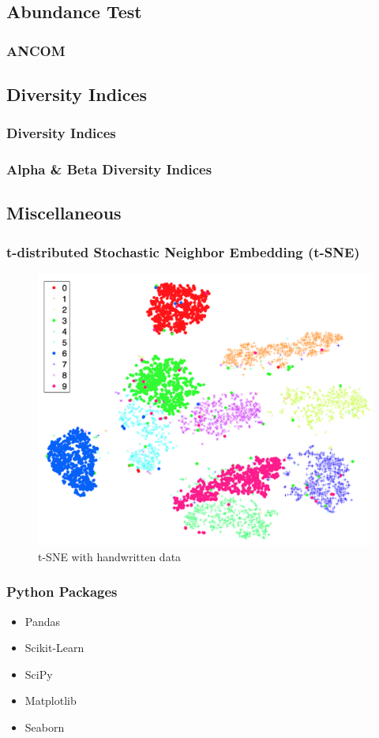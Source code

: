 \documentclass{beamer}
\begin{document}
    \subsection{Abundance Test}
    \begin{frame}
        \frametitle{ANCOM}
    \end{frame}

    \subsection{Diversity Indices}
    \begin{frame}
        \frametitle{Diversity Indices}
    \end{frame}

    \begin{frame}
        \frametitle{Alpha \& Beta Diversity Indices}
    \end{frame}

    \subsection{Miscellaneous}
    \begin{frame}
        \frametitle{t-distributed Stochastic Neighbor Embedding (t-SNE)}

        \begin{figure}
            \includegraphics[width=0.6 \linewidth]{figures/tsne.png}
            \caption{t-SNE with handwritten data \protect \cite{tsne1}}
        \end{figure}
    \end{frame}

    \begin{frame}
        \frametitle{Python Packages}

        \begin{itemize}
            \item Pandas \cite{pandas1}
            \item Scikit-Learn \cite{sklearn1}
            \item SciPy \cite{scipy1}
            \item Matplotlib \cite{matplotlib1}
            \item Seaborn \cite{seaborn1}
        \end{itemize}
    \end{frame}
\end{document}
